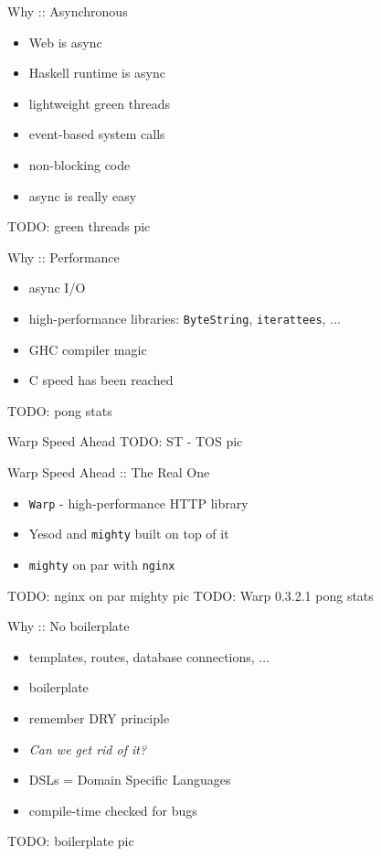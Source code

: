 \documentclass{beamer}
\begin{document}
\begin{frame}{Why :: Asynchronous}
  \begin{itemize}[<+->]
    \item Web is async
    \item Haskell runtime is async
    \item lightweight green threads
    \item event-based system calls
    \item non-blocking code
    \item async is really easy
  \end{itemize}
  TODO: green threads pic
\end{frame}

\begin{frame}{Why :: Performance}
  \begin{itemize}[<+->]
    \item async I/O
    \item high-performance libraries: \texttt{ByteString},
    \texttt{iterattees}, $\ldots$
    \item GHC compiler magic
    \item C speed has been reached
  \end{itemize}
  TODO: pong stats
\end{frame}

\begin{frame}{Warp Speed Ahead}
  TODO: ST - TOS pic
\end{frame}

\begin{frame}{Warp Speed Ahead :: The Real One}
  \begin{itemize}[<+->]
    \item \texttt{Warp} - high-performance HTTP library
    \item Yesod and \texttt{mighty} built on top of it
    \item \texttt{mighty} on par with \texttt{nginx}
  \end{itemize}
  TODO: nginx on par mighty pic
  TODO: Warp 0.3.2.1 pong stats
\end{frame}

\begin{frame}{Why :: No boilerplate}
  \begin{itemize}[<+->]
    \item templates, routes, database connections, $\ldots$
    \item boilerplate
    \item remember DRY principle
    \item \textit{Can we get rid of it?}
    \item DSLs = Domain Specific Languages
    \item compile-time checked for bugs
  \end{itemize}
  TODO: boilerplate pic
\end{frame}
\end{document}
